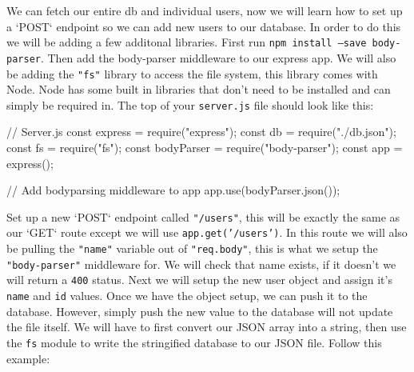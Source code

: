 \documentclass{42-en}
\begin{document}
    We can fetch our entire db and individual users, now we will learn how to set up a `POST` endpoint so we can add new users to our database. In order to do this we will be adding a few additonal libraries. First run \texttt{npm install --save body-parser}. Then add the body-parser middleware to our express app. We will also be adding the \texttt{"fs"} library to access the file system, this library comes with Node. Node has some built in libraries that don't need to be installed and can simply be required in. The top of your \texttt{server.js} file should look like this:

\begin{42jscode}
        // Server.js
        const express = require("express");
        const db = require("./db.json");
        const fs = require("fs");
        const bodyParser = require("body-parser");
        const app = express();

        // Add bodyparsing middleware to app
        app.use(bodyParser.json());
\end{42jscode}
\newpage
    Set up a new `POST` endpoint called \texttt{"/users"}, this will be exactly the same as our `GET` route except we will use \texttt{app.get('/users')}. In this route we will also be pulling the \texttt{"name"} variable out of \texttt{"req.body"}, this is what we setup the \texttt{"body-parser"} middleware for. We will check that name exists, if it doesn't we will return a \texttt{400} status. Next we will setup the new user object and assign it's \texttt{name} and \texttt{id} values. Once we have the object setup, we can push it to the database. However, simply push the new value to the database will not update the file itself. We will have to first convert our JSON array into a string, then use the \texttt{fs} module to write the stringified database to our JSON file. Follow this example:
\end{document}
